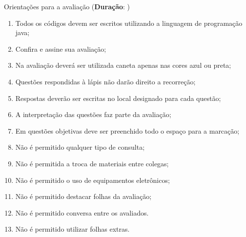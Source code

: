 \begin{framed}
	\begin{center}
		Orientações para a avaliação (\textbf{Duração}: \underline{\duracao})
	\end{center}
		\begin{multicols}{2}
		{\footnotesize
		\begin{enumerate}
		\itemsep0em
		\item Todos os códigos devem ser escritos utilizando a linguagem de programação java;
		\item Confira e assine sua avaliação;
		\item Na avaliação deverá ser utilizada caneta apenas nas cores azul ou preta;
		\item Questões respondidas à lápis não darão direito a recorreção;
		\item Respostas deverão ser escritas no local designado para cada questão;
		\item A interpretação das questões faz parte da avaliação;
		\item Em questões objetivas deve ser preenchido todo o espaço para a marcação;
		\item Não é permitido qualquer tipo de consulta;
		\item Não é permitida a troca de materiais entre colegas;
		\item Não é permitido o uso de equipamentos eletrônicos;
		\item Não é permitido destacar folhas da avaliação;
		\item Não é permitido conversa entre os avaliados.		
		\item Não é permitido utilizar folhas extras.
		\end{enumerate}
		}
		\end{multicols}
\end{framed}